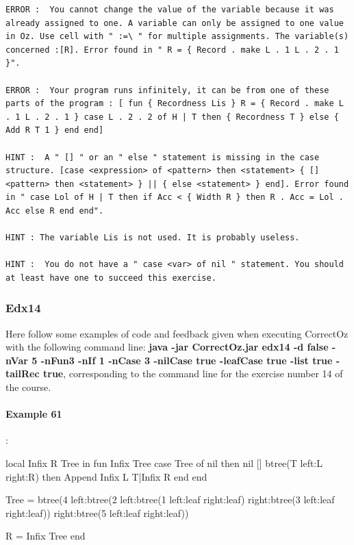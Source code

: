 \documentclass[11pt,a4paper,twoside,openright]{report}
\begin{document}
\begin{lstlisting}
ERROR :  You cannot change the value of the variable because it was already assigned to one. A variable can only be assigned to one value in Oz. Use cell with " :=\ " for multiple assignments. The variable(s) concerned :[R]. Error found in " R = { Record . make L . 1 L . 2 . 1 }".

ERROR :  Your program runs infinitely, it can be from one of these parts of the program : [ fun { Recordness Lis } R = { Record . make L . 1 L . 2 . 1 } case L . 2 . 2 of H | T then { Recordness T } else { Add R T 1 } end end]

HINT :  A " [] " or an " else " statement is missing in the case structure. [case <expression> of <pattern> then <statement> { [] <pattern> then <statement> } || { else <statement> } end]. Error found in " case Lol of H | T then if Acc < { Width R } then R . Acc = Lol . Acc else R end end".

HINT : The variable Lis is not used. It is probably useless.

HINT :  You do not have a " case <var> of nil " statement. You should at least have one to succeed this exercise.
\end{lstlisting}

\subsubsection{Edx14}
Here follow some examples of code and feedback given when executing 
CorrectOz with the following command line: \textbf{java -jar CorrectOz.jar edx14 -d 
false -nVar 5 -nFun3 -nIf 1 -nCase 3 -nilCase true -leafCase true -list true 
-tailRec true}, corresponding to the command line for the exercise number 14 of 
the course.

\paragraph{Example 61}:

\begin{OZ}
local Infix R Tree in 
	fun {Infix Tree}
		case Tree of nil then nil
		[] btree(T left:L right:R) then {Append {Infix L} T|{Infix R}}
		end
	end

	Tree = btree(4 left:btree(2 left:btree(1 left:leaf right:leaf)
                                   right:btree(3 left:leaf right:leaf))
               right:btree(5 left:leaf right:leaf))
	
	R = {Infix Tree}
end
\end{OZ}
\end{document}
